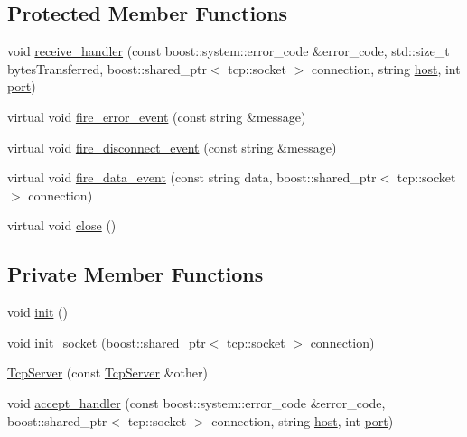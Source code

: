 \subsection*{Protected Member Functions}
\begin{DoxyCompactItemize}
\item 
void \hyperlink{classTcpServer_a99739644296c7c2647022695d0d0bdbe}{receive\_\-handler} (const boost::system::error\_\-code \&error\_\-code, std::size\_\-t bytesTransferred, boost::shared\_\-ptr$<$ tcp::socket $>$ connection, string \hyperlink{classTcp_a0e981d15f94a460b91845bce9b930c61}{host}, int \hyperlink{classTcp_a7ed15f78afc9d0675404b4b41cc723ba}{port})
\item 
virtual void \hyperlink{classTcpServer_a07ef4a083656e07099f615d34d3627a1}{fire\_\-error\_\-event} (const string \&message)
\item 
virtual void \hyperlink{classTcpServer_aef3b4f4665d3fab448008201915f1fd5}{fire\_\-disconnect\_\-event} (const string \&message)
\item 
virtual void \hyperlink{classTcpServer_a49708224d7eb73b2371b53d672b626e5}{fire\_\-data\_\-event} (const string data, boost::shared\_\-ptr$<$ tcp::socket $>$ connection)
\item 
virtual void \hyperlink{classTcpServer_a6e94bd28e3d3d506609df98afb94c879}{close} ()
\end{DoxyCompactItemize}
\subsection*{Private Member Functions}
\begin{DoxyCompactItemize}
\item 
void \hyperlink{classTcpServer_a64291f0ad4b590f32414ca93fffd13f0}{init} ()
\item 
void \hyperlink{classTcpServer_a6906e0426ba0dc59b4103478a886be46}{init\_\-socket} (boost::shared\_\-ptr$<$ tcp::socket $>$ connection)
\item 
\hyperlink{classTcpServer_abf9de49e9fca80c26eb5143bea332eaa}{TcpServer} (const \hyperlink{classTcpServer}{TcpServer} \&other)
\item 
void \hyperlink{classTcpServer_ac07bb7a42599e9f90f67a11bcba2285e}{accept\_\-handler} (const boost::system::error\_\-code \&error\_\-code, boost::shared\_\-ptr$<$ tcp::socket $>$ connection, string \hyperlink{classTcp_a0e981d15f94a460b91845bce9b930c61}{host}, int \hyperlink{classTcp_a7ed15f78afc9d0675404b4b41cc723ba}{port})
\end{DoxyCompactItemize}
